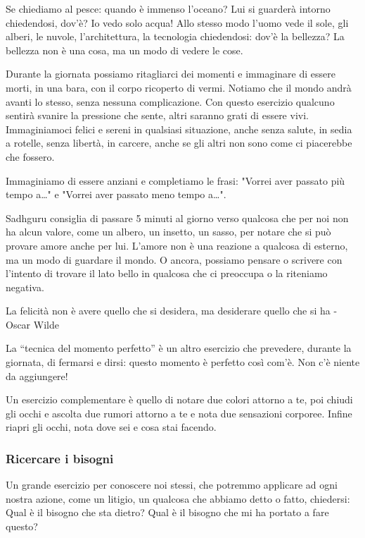 \documentclass[12pt]{book} %
\begin{document}
Se chiediamo al pesce: quando è immenso l'oceano? Lui si guarderà intorno chiedendosi, dov'è? Io
vedo solo acqua! Allo stesso modo l'uomo vede il sole, gli alberi, le nuvole,
l'architettura, la tecnologia chiedendosi: dov'è la bellezza? La bellezza non è una cosa, ma un
modo di vedere le cose.

Durante la giornata possiamo ritagliarci dei momenti e immaginare di essere morti, in una bara, con il corpo ricoperto
di vermi. Notiamo che il mondo andrà avanti lo stesso, senza nessuna complicazione. Con questo esercizio qualcuno
sentirà svanire la pressione che sente, altri saranno grati di essere vivi.
Immaginiamoci felici e sereni in qualsiasi situazione, anche senza salute, in sedia a rotelle, senza libertà, in carcere, anche se gli altri non sono come ci piacerebbe che fossero.

Immaginiamo di essere anziani e completiamo le frasi: "Vorrei aver passato più tempo a…" e "Vorrei aver passato meno tempo a…". 

Sadhguru consiglia di passare 5 minuti al giorno verso qualcosa che per noi non ha alcun valore, come un albero, un
insetto, un sasso, per notare che si può provare amore anche per lui. L'amore non è una reazione a qualcosa di esterno,
ma un modo di guardare il mondo. O ancora, possiamo pensare o scrivere con l'intento di trovare il
lato bello in qualcosa che ci preoccupa o la riteniamo negativa.

La felicità non è avere quello che si desidera, ma desiderare quello che si ha - Oscar Wilde 

La “tecnica del momento perfetto” è un altro esercizio che prevedere, durante la giornata, di fermarsi e dirsi: questo
momento è perfetto così com'è. Non c'è niente da aggiungere!

Un esercizio complementare è quello di notare due colori attorno a te, poi chiudi gli occhi e ascolta due rumori attorno a te e nota due sensazioni corporee. Infine riapri gli occhi, nota dove sei e cosa stai facendo.

\subsubsection{Ricercare i bisogni}
Un grande esercizio per conoscere noi stessi, che potremmo applicare ad ogni nostra azione, come un litigio, un qualcosa che abbiamo detto o fatto, chiedersi: Qual è il bisogno che sta dietro? Qual è il  bisogno che mi ha portato a fare questo?
\end{document}

